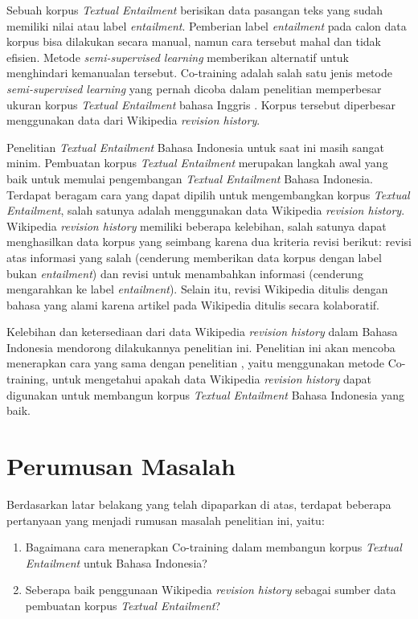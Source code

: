 Sebuah korpus \textit{Textual Entailment} berisikan data pasangan teks yang sudah memiliki nilai atau label \textit{entailment}. Pemberian label \textit{entailment} pada calon data korpus bisa dilakukan secara manual, namun cara tersebut mahal dan tidak efisien. Metode \textit{semi-supervised learning} memberikan alternatif untuk menghindari kemanualan tersebut. Co-training adalah salah satu jenis metode \textit{semi-supervised learning} yang pernah dicoba dalam penelitian memperbesar ukuran korpus \textit{Textual Entailment} bahasa Inggris \citep{zanzottoRTEexpand}. Korpus tersebut diperbesar menggunakan data dari Wikipedia \textit{revision history}. 

Penelitian \textit{Textual Entailment} Bahasa Indonesia untuk saat ini masih sangat minim. Pembuatan korpus \textit{Textual Entailment} merupakan langkah awal yang baik untuk memulai pengembangan \textit{Textual Entailment} Bahasa Indonesia. Terdapat beragam cara yang dapat dipilih untuk mengembangkan korpus \textit{Textual Entailment}, salah satunya adalah menggunakan data Wikipedia \textit{revision history}. Wikipedia \textit{revision history} memiliki beberapa kelebihan, salah satunya dapat menghasilkan data korpus yang seimbang karena dua kriteria revisi berikut: revisi atas informasi yang salah (cenderung memberikan data korpus dengan label bukan \textit{entailment}) dan revisi untuk menambahkan informasi (cenderung mengarahkan ke label \textit{entailment}). Selain itu, revisi Wikipedia ditulis dengan bahasa yang alami karena artikel pada Wikipedia ditulis secara kolaboratif. 

Kelebihan dan ketersediaan dari data Wikipedia \textit{revision history} dalam Bahasa Indonesia mendorong dilakukannya penelitian ini. Penelitian ini akan mencoba menerapkan cara yang sama dengan penelitian \cite{zanzottoRTEexpand}, yaitu menggunakan metode Co-training, untuk mengetahui apakah data Wikipedia \textit{revision history} dapat digunakan untuk membangun korpus \textit{Textual Entailment} Bahasa Indonesia yang baik.

\section{Perumusan Masalah}
Berdasarkan latar belakang yang telah dipaparkan di atas, terdapat beberapa pertanyaan yang menjadi rumusan masalah penelitian ini, yaitu:
\begin{enumerate}
	\item Bagaimana cara menerapkan Co-training dalam membangun korpus \textit{Textual Entailment} untuk Bahasa Indonesia?
	\item Seberapa baik penggunaan Wikipedia \textit{revision history} sebagai sumber data pembuatan korpus \textit{Textual Entailment}?
\end{enumerate}

